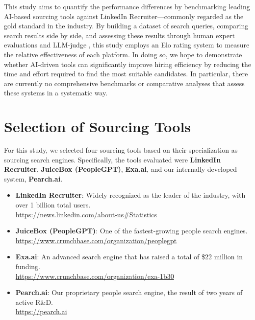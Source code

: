 \documentclass{article}
\begin{document}
This study aims to quantify the performance differences by benchmarking leading AI-based sourcing tools against LinkedIn Recruiter—commonly regarded as the gold standard in the industry. By building a dataset of search queries, comparing search results side by side, and assessing these results through human expert evaluations and LLM-judge \cite{zheng2023judging}, this study employs an Elo rating system \cite{elo1966uscf} to measure the relative effectiveness of each platform. In doing so, we hope to demonstrate whether AI-driven tools can significantly improve hiring efficiency by reducing the time and effort required to find the most suitable candidates.
In particular, there are currently no comprehensive benchmarks or comparative analyses that assess these systems in a systematic way.


\section{Selection of Sourcing Tools}
 
For this study, we selected four sourcing tools based on their specialization as sourcing search engines. Specifically, the tools evaluated were \textbf{LinkedIn Recruiter}, \textbf{JuiceBox (PeopleGPT)}, \textbf{Exa.ai}, and our internally developed system, \textbf{Pearch.ai}.

\begin{itemize}
    \item \textbf{LinkedIn Recruiter}: Widely recognized as the leader of the industry, with over 1 billion total users.\\
    \url{https://news.linkedin.com/about-us#Statistics}
    
    \item \textbf{JuiceBox (PeopleGPT)}: One of the fastest-growing people search engines.\\
    \url{https://www.crunchbase.com/organization/peoplegpt}
    
    \item \textbf{Exa.ai}: An advanced search engine that has raised a total of \$22 million in funding.\\
    \url{https://www.crunchbase.com/organization/exa-1b30}
    
    \item \textbf{Pearch.ai}: Our proprietary people search engine, the result of two years of active R\&D.\\
    \url{https://pearch.ai}
\end{itemize}
\end{document}
